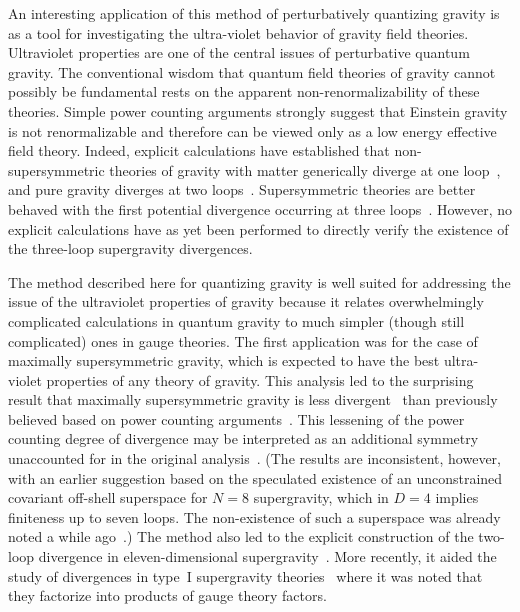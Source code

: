 \documentclass[12pt]{livrev}
\begin{document}
An interesting application of this method of perturbatively quantizing
gravity is as a tool for investigating the ultra-violet behavior of
gravity field theories.  Ultraviolet properties are one of the central
issues of perturbative quantum gravity. The conventional wisdom that
quantum field theories of gravity cannot possibly be fundamental
rests on the apparent non-renormalizability of these
theories.  Simple power counting arguments strongly suggest that
Einstein gravity is not renormalizable and therefore can be viewed
only as a low energy effective field theory.  Indeed, explicit
calculations have established that non-supersymmetric theories of
gravity with matter generically diverge at one
loop~\cite{tHooftVeltmanAnnPoin,Deser74,DeserTsao74}, and pure gravity
diverges at two loops~\cite{Goroff86,vandeVen92}.  Supersymmetric
theories are better behaved with the first potential divergence
occurring at three loops~\cite{Deser77,Howe81,Howe89}.  However, no
explicit calculations have as yet been performed to directly
verify the existence of the three-loop supergravity divergences.

The method described here for quantizing gravity is well suited for
addressing the issue of the ultraviolet properties of gravity because
it relates overwhelmingly complicated calculations in quantum gravity
to much simpler (though still complicated) ones in gauge theories.
The first application was for the case of maximally supersymmetric
gravity, which is expected to have the best ultra-violet properties of
any theory of gravity.  This analysis led to the surprising result
that maximally supersymmetric gravity is less divergent~\cite{BDDPR}
than previously believed based on power counting
arguments~\cite{Deser77,Howe81,Howe89}.  This lessening of the power
counting degree of divergence may be interpreted as an additional
symmetry unaccounted for in the original analysis~\cite{Stelle}.  (The
results are inconsistent, however, with an earlier suggestion
\cite{GrisaruSiegel} based on the speculated existence of an
unconstrained covariant off-shell superspace for $N=8$ supergravity,
which in $D=4$ implies finiteness up to seven loops.  The
non-existence of such a superspace was already noted a while
ago~\cite{Howe89}.)  The method also led to the explicit construction
of the two-loop divergence in eleven-dimensional
supergravity~\cite{BDDPR,DeserSeminara99,DeserSeminara00,Bern00Counterterms}.
More recently, it aided the study of divergences in type~I
supergravity theories~\cite{DunbarJulia} where it was noted that they
factorize into products of gauge theory factors.
\end{document}
